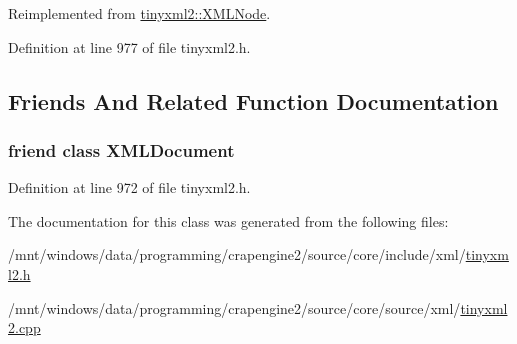 Reimplemented from \hyperlink{classtinyxml2_1_1_x_m_l_node_aedae0bbb58d533a4b8a61042388b49e5}{tinyxml2\+::\+X\+M\+L\+Node}.



Definition at line 977 of file tinyxml2.\+h.



\subsection{Friends And Related Function Documentation}
\hypertarget{classtinyxml2_1_1_x_m_l_declaration_a4eee3bda60c60a30e4e8cd4ea91c4c6e}{
\subsubsection[{X\+M\+L\+Document}]{\setlength{\rightskip}{0pt plus 5cm}friend class {\bf X\+M\+L\+Document}\hspace{0.3cm}{\ttfamily [friend]}}}\label{classtinyxml2_1_1_x_m_l_declaration_a4eee3bda60c60a30e4e8cd4ea91c4c6e}


Definition at line 972 of file tinyxml2.\+h.



The documentation for this class was generated from the following files\+:\begin{DoxyCompactItemize}
\item 
/mnt/windows/data/programming/crapengine2/source/core/include/xml/\hyperlink{tinyxml2_8h}{tinyxml2.\+h}\item 
/mnt/windows/data/programming/crapengine2/source/core/source/xml/\hyperlink{tinyxml2_8cpp}{tinyxml2.\+cpp}\end{DoxyCompactItemize}
